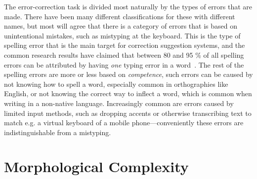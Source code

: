 \documentclass[officiallayout]{unihelcompling}
\begin{document}
The error-correction task is divided most naturally by the types of errors that
are made. There have been many different classifications for these with
different names, but most will agree that there is a
category of errors that is based on unintentional mistakes, such as
mistyping at the keyboard. This is the type of spelling error that is the
main target for correction suggestion systems, and the common
research results have claimed that between 80 and 95 \% of all spelling
errors can be attributed by having \emph{one} typing error in a 
word~\citep{kukich1992techniques}. The rest of the spelling errors are more
or less based on \emph{competence}, such errors can be caused by not knowing
how to spell a word, especially common in orthographies like English, or not
knowing the correct way to inflect a word, which is common when writing in a
non-native language. Increasingly common are errors caused by limited input
methods, such as dropping accents or otherwise transcribing text to match e.g.
a virtual keyboard of a mobile phone---conveniently these errors are 
indistinguishable from a mistyping.



\section{Morphological Complexity}
\label{sec:morphological-complexity}
\end{document}
